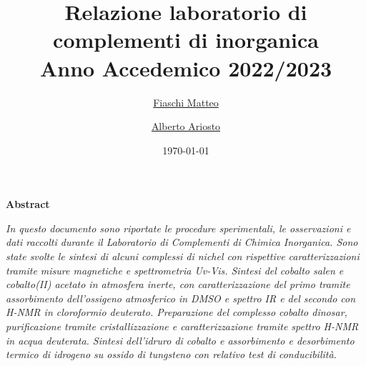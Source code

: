 \documentclass[10pt]{article}
\title{\huge{Relazione laboratorio di complementi di inorganica}
\vspace{1mm}\\
\Large{Anno Accedemico 2022/2023}}
\author{\href{mailto:m.fiaschi10@studenti.unipi.it}{Fiaschi Matteo} \and \href{mailto:a.ariosto@studenti.unipi.it}{Alberto Ariosto}}
\date{\today}
\begin{document}
\maketitle
\begin{center}
    \textbf{Abstract}
\end{center}
\noindent \textit{ In questo documento sono riportate le procedure sperimentali, le osservazioni e dati raccolti durante il Laboratorio di Complementi di Chimica Inorganica. Sono state svolte le sintesi di alcuni complessi di nichel con rispettive caratterizzazioni tramite misure magnetiche e spettrometria Uv-Vis. Sintesi del cobalto salen e cobalto(II) acetato in atmosfera inerte, con caratterizzazione del primo tramite assorbimento dell'ossigeno atmosferico in DMSO e spettro IR e del secondo con H-NMR in cloroformio deuterato. Preparazione del complesso cobalto dinosar, purificazione tramite cristallizzazione e  caratterizzazione tramite spettro H-NMR in acqua deuterata. Sintesi dell'idruro di  cobalto e assorbimento e desorbimento termico di idrogeno su ossido di tungsteno con relativo test di conducibilità. }










\end{document}
